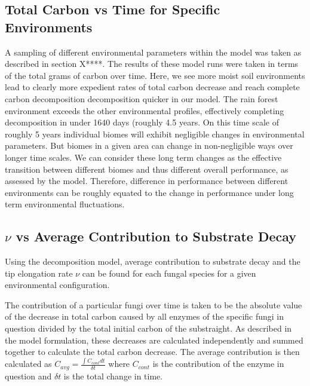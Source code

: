 \documentclass[12pt]{article}
\begin{document}
\begin{multicols}{2}

\subsection{Total Carbon vs Time for Specific Environments} %
A sampling of different environmental parameters within the model was taken as described in section X****. The results of these model runs were taken in terms of the total grams of carbon over time. Here, we see more moist soil environments lead to clearly more expedient rates of total carbon decrease and reach complete carbon decomposition decomposition quicker in our model. The rain forest environment exceeds the other environmental profiles, effectively completing decomposition in under 1640 days (roughly 4.5 years. On this time scale of roughly 5 years individual biomes will exhibit negligible changes in environmental parameters. But biomes in a given area can change in non-negligible ways over longer time scales. We can consider these long term changes as the effective transition between different biomes and thus different overall performance, as assessed by the model. Therefore, difference in performance between different environments can be roughly equated to the change in performance under long term environmental fluctuations. 

\subsection{$\nu$ vs Average Contribution to Substrate Decay} %
Using the decomposition model, average contribution to substrate decay and the tip elongation rate $\nu$ can be found for each fungal species for a given environmental configuration. 

The contribution of a particular fungi over time is taken to be the absolute value of the decrease in total carbon caused by all enzymes of the specific fungi in question divided by the total initial carbon of the substraight. As described in the model formulation, these decreases are calculated independently and summed together to calculate the total carbon decrease. The average contribution is then calculated as $C_{avg} = \frac{ \int C_{cont} dt}{\delta t}$ where $C_{cont}$ is the contribution of the enzyme in question and $\delta t$ is the total change in time.


\end{multicols}
\end{document}
